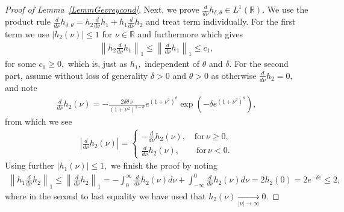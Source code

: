 \documentclass[11pt]{amsart}
\newcommand{\1}{\mathbbm{1}}
\newcommand{\R}{\mathbb{R}}
\newcommand{\hatfMdelta}{\widehat{f}_{\!\scalebox{0.6}{$\mathscr{M}$}_\delta}}
\newcommand{\fMdelta}{f_{\!\scalebox{0.6}{$\mathscr{M}$}_\delta}}
\newcommand{\bin}[1]{}
\theoremstyle{plain}
\theoremstyle{definition}
\theoremstyle{remark}
\numberwithin{equation}{section}
\begin{document}
\begin{proof}[Proof of Lemma~\ref{LemmGevreycond}]
Next, we prove $\frac{d}{d\nu} h_{\delta,\theta} \in L^1(\R).$ We use the product rule $\frac{d}{d\nu} h_{\delta,\theta} = h_2 \frac{d}{d\nu}h_1 + h_1\frac{d}{d\nu}h_2$ and treat term individually. For the first term we use $|h_2(\nu)|\le 1$ for $\nu\in\R$ and furthermore \cite[Lemma 28]{ding2025efficient} which gives 
\begin{align*}
   \left\|h_2 \frac{d}{d\nu}h_1 \right\|_1 \le \left\|\frac{d}{d\nu}h_1 \right\|_1 \le c _1,
\end{align*}
for some $c_1\ge 0,$ which is, just as $h_1,$ independent of $\theta$ and $\delta.$ 
For the second part, assume without loss of generality $\delta>0$ and $\theta>0$ as otherwise $\frac{d}{d\nu} h_2=0,$ and note
\begin{align*}
    \frac{d}{d\nu} h_2(\nu) = -\frac{2\delta \theta \, \nu}{(1+\nu^2)^{1-\theta}} e^{(1+\nu^2)^\theta }\exp\left(-\delta e^{(1+\nu^2)^\theta}\right),
\end{align*}
from which we see
\begin{align*}
  \left| \frac{d}{d\nu} h_2(\nu)\right| = \begin{cases}
   -\frac{d}{d\nu} h_2(\nu),\quad\text{for} \, \nu\ge 0,\\
   \frac{d}{d\nu} h_2(\nu),\qquad\text{for} \, \nu<0.
   \end{cases} 
\end{align*}
Using further $|h_1(\nu)|\le 1,$ we finish the proof by noting
\begin{align*}
    \left\|h_1\frac{d}{d\nu} h_2\right\|_1 \le \left\|\frac{d}{d\nu} h_2\right\|_1 = -\int_0^\infty \frac{d}{d\nu} h_2(\nu) d\nu + \int_{-\infty}^0 \frac{d}{d\nu} h_2(\nu) d\nu = 2 h_2(0) = 2 e^{-\delta e}\le 2,
\end{align*}
where in the second to last equality we have used that $h_2(\nu)\xrightarrow[|\nu|\to \infty]{}0.$
\end{proof}


\bin{By standard arguments\footnote{To see this note $|\fMdelta(t)| \le \frac{1}{2\pi}\|\hatfMdelta\|_1.$  Furthermore, by  partially integrating twice $\int \hatfMdelta(\nu) e^{-it\nu}d\nu = \tfrac{-1}{t^2} \int \hatfMdelta''(\nu) e^{-it\nu}d\nu$, where we used that the boundary terms vanish as $\delta>0,$ and therefore $|\fMdelta(t)| \le \tfrac{1}{t^2}\|\hatfMdelta''\|_1.$ Combining both, we see for $R>0$ that $\|\fMdelta\|_1 \le \frac{1}{2\pi}\left(\int_{|t|\le R} \|\hatfMdelta\|_1 dt + \int_{|t|> R} \tfrac{\|\hatfMdelta''\|_1 }{t^2}dt\right) = \tfrac{1}{\pi}\left(R\|\hatfMdelta\|_1+\tfrac{\|\hatfMdelta''\|_1}{R}\right).$ Choosing $R = \sqrt{\|\hatfMdelta''\|_1/\|\hatfMdelta\|_1}$ yields \eqref{eq:StandardL1Bound}.}
\begin{align}
\label{eq:StandardL1Bound}
\left\|\fMdelta\right\|_1 \le \frac{2}{\pi}\sqrt{\left\|\hatfMdelta\right\|_1,\left\|\hatfMdelta''\right\|_1}
\end{align}}











\end{document}
